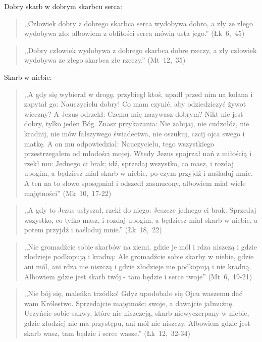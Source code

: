 \documentclass[10pt,a4paper,oneside]{article}
\begin{document}
Dobry skarb w dobrym skarbcu serca:
\begin{quote}
,,Człowiek dobry z dobrego skarbca serca wydobywa dobro, a zły ze złego wydobywa zło; albowiem z obfitości serca mówią usta jego.'' (Łk~6,~45)
\end{quote}
\begin{quote}
,,Dobry człowiek wydobywa z dobrego skarbca dobre rzeczy, a zły człowiek wydobywa ze złego skarbca złe rzeczy.'' (Mt~12,~35)
\end{quote}

Skarb w niebie:
\begin{quote}
,,A gdy się wybierał w drogę, przybiegł ktoś, upadł przed nim na kolana i zapytał go: Nauczycielu dobry! Co mam czynić, aby odziedziczyć żywot wieczny? A Jezus odrzekł: Czemu mię nazywasz dobrym? Nikt nie jest dobry, tylko jeden Bóg. Znasz przykazania: Nie zabijaj, nie cudzołóż, nie kradnij, nie mów fałszywego świadectwa, nie oszukuj, czcij ojca swego i matkę. A on mu odpowiedział: Nauczycielu, tego wszystkiego przestrzegałem od młodości mojej. Wtedy Jezus spojrzał nań z miłością i rzekł mu: Jednego ci brak; idź, sprzedaj wszystko, co masz, i rozdaj ubogim, a będziesz miał skarb w niebie, po czym przyjdź i naśladuj mnie. A ten na to słowo sposępniał i odszedł zasmucony, albowiem miał wiele majętności'' (Mk~10,~17-22)
\end{quote}
\begin{quote}
,,A gdy to Jezus usłyszał, rzekł do niego: Jeszcze jednego ci brak. Sprzedaj wszystko, co tylko masz, i rozdaj ubogim, a będziesz miał skarb w niebie, a potem przyjdź i naśladuj mnie.'' (Łk~18,~22)
\end{quote}
\begin{quote}
,,Nie gromadźcie sobie skarbów na ziemi, gdzie je mól i rdza niszczą i gdzie złodzieje podkopują i kradną: Ale gromadźcie sobie skarby w niebie, gdzie ani mól, ani rdza nie niszczą i gdzie złodzieje nie podkopują i nie kradną. Albowiem gdzie jest skarb twój - tam będzie i serce twoje'' (Mt~6,~19-21)
\end{quote}
\begin{quote}
,,Nie bój się, maleńka trzódko! Gdyż upodobało się Ojcu waszemu dać wam Królestwo. Sprzedajcie majętności swoje, a dawajcie jałmużnę. Uczyńcie sobie sakwy, które nie niszczeją, skarb niewyczerpany w niebie, gdzie złodziej nie ma przystępu, ani mól nie niszczy. Albowiem gdzie jest skarb wasz, tam będzie i serce wasze.'' (Łk~12,~32-34)
\end{quote}
\end{document}
